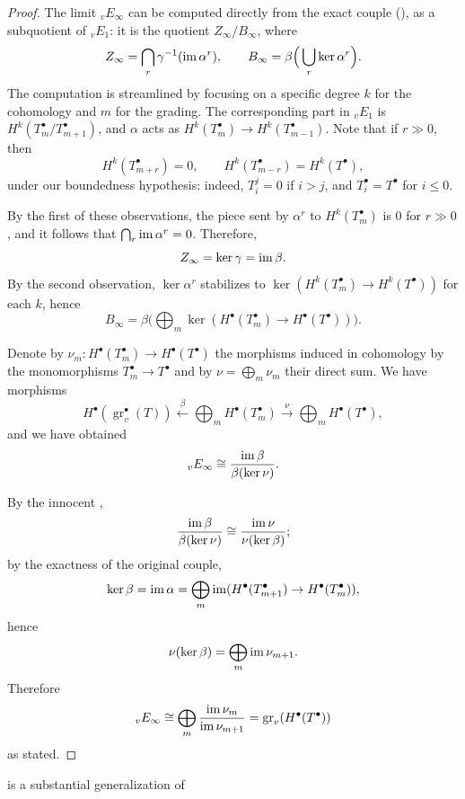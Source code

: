 \begin{proof}
  The limit ${}_vE_\infty$ can be computed directly from the exact
  couple
  (),
  as a subquotient of ${}_vE_1$: it is the quotient
  $Z_\infty/B_\infty$, where
  \[
    Z_\infty = \bigcap_r \gamma^{-1}(\operatorname{im}\alpha^r), \qquad B_\infty
    = \beta\Big(\bigcup_r \ker\alpha^r\Big).
  \]
  The computation is streamlined by focusing on a specific degree $k$
  for the cohomology and $m$ for the grading. The corresponding part
  in ${}_vE_1$ is $H^k(T_m^\bullet/T_{m+1}^\bullet)$, and $\alpha$
  acts as $H^k(T_m^\bullet) \to H^k(T_{m-1}^\bullet)$. Note that if
  $r \gg 0$, then
  \[
    H^k(T_{m+r}^\bullet) = 0, \qquad H^k(T_{m-r}^\bullet) =
    H^k(T^\bullet),
  \]
  under our boundedness hypothesis: indeed, $T_i^j = 0$ if $i > j$,
  and $T_i^\bullet = T^\bullet$ for $i \le 0$.

  By the first of these observations, the piece sent by $\alpha^r$ to
  $H^k(T_m^\bullet)$ is $0$ for $r \gg 0$, and it follows that
  $\bigcap_r \operatorname{im}\alpha^r = 0$. Therefore,
  \[
    Z_\infty = \ker\gamma = \operatorname{im}\beta.
  \]
  By the second observation, $\ker\alpha^r$ stabilizes to
  $\ker(H^k(T_m^\bullet) \to H^k(T^\bullet))$ for each $k$, hence
  \[
    B_\infty = \beta\Big(\bigoplus_m \ker(H^\bullet(T_m^\bullet) \to
    H^\bullet(T^\bullet))\Big).
  \]

  Denote by $\nu_m : H^\bullet(T_m^\bullet) \to H^\bullet(T^\bullet)$
  the morphisms induced in cohomology by the monomorphisms
  $T_m^\bullet \to T^\bullet$ and by $\nu = \bigoplus_m \nu_m$ their
  direct sum. We have morphisms
  \[
    H^\bullet(\operatorname{gr}_v^\bullet(T)) \xleftarrow{\ \beta\ }
    \bigoplus_m H^\bullet(T_m^\bullet) \xrightarrow{\ \nu\ }
    \bigoplus_m H^\bullet(T^\bullet),
  \]
  and we have obtained
  \[ {}_vE_\infty \cong \frac{\operatorname{im}\beta}{\beta(\ker\nu)}.
  \]

  By the innocent
  ,
  \[
    \frac{\operatorname{im}\beta}{\beta(\ker\nu)} \cong
    \frac{\operatorname{im}\nu}{\nu(\ker\beta)};
  \]
  by the exactness of the original couple,
  \[
    \ker\beta = \operatorname{im}\alpha = \bigoplus_m
    \operatorname{im}(H^\bullet(T_{m+1}^\bullet) \to H^\bullet(T_m^\bullet)),
  \]
  hence
  \[
    \nu(\ker\beta) = \bigoplus_m \operatorname{im}\nu_{m+1}.
  \]
  Therefore
  \[ {}_vE_\infty \cong \bigoplus_m \frac{\operatorname{im}\nu_m}
    {\operatorname{im}\nu_{m+1}} = \operatorname{gr}_v(H^\bullet(T^\bullet))
  \]
  as stated.
\end{proof}
 is a substantial generalization of
